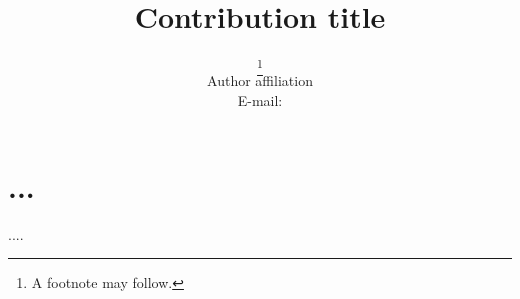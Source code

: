 \documentclass{PoS}
\title{Contribution title}
\author{\speaker{First Author}\thanks{A footnote may follow.}\\
        Author affiliation\\
        E-mail: \email{author@email}}
\begin{document}
\section{...}

\begin{thebibliography}{99}
....

\end{thebibliography}
\end{document}
